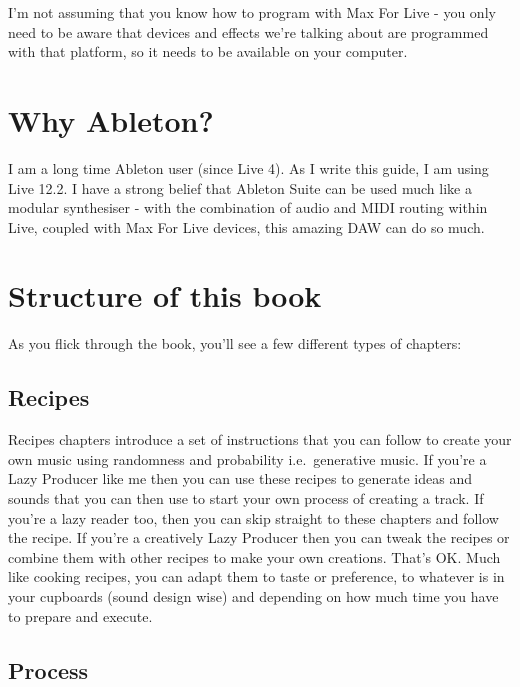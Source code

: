 \documentclass[
  12pt,
  letterpaper,
  oneside,
  open=any]{scrbook}
\begin{document}
I'm not assuming that you know how to program with Max For Live - you
only need to be aware that devices and effects we're talking about are
programmed with that platform, so it needs to be available on your
computer.

\section*{Why Ableton?}\label{why-ableton}


I am a long time Ableton user (since Live 4). As I write this guide, I
am using Live 12.2. I have a strong belief that Ableton Suite can be
used much like a modular synthesiser - with the combination of audio and
MIDI routing within Live, coupled with Max For Live devices, this
amazing DAW can do so much.

\section*{Structure of this book}\label{structure-of-this-book}


As you flick through the book, you'll see a few different types of
chapters:

\subsection*{Recipes}\label{recipes}

Recipes chapters introduce a set of instructions that you can follow to
create your own music using randomness and probability i.e.~generative
music. If you're a Lazy Producer like me then you can use these recipes
to generate ideas and sounds that you can then use to start your own
process of creating a track. If you're a lazy reader too, then you can
skip straight to these chapters and follow the recipe. If you're a
creatively Lazy Producer then you can tweak the recipes or combine them
with other recipes to make your own creations. That's OK. Much like
cooking recipes, you can adapt them to taste or preference, to whatever
is in your cupboards (sound design wise) and depending on how much time
you have to prepare and execute.

\subsection*{Process}\label{process}
\end{document}
